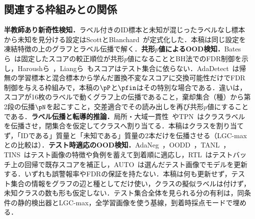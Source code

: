 \subsection{関連する枠組みとの関係}
\label{sec:related}
\textbf{半教師あり新奇性検知．}ラベル付きのID標本と未知が混じったラベルなし標本から未知を見分ける設定はScottとBlanchard~\cite{scott2009novelty,blanchard2010ssnd}が定式化した．本稿は同じ設定を凍結特徴の上のグラフとラベル伝播で解く．\textbf{共形$p$値によるOOD検知．}Batesら~\cite{bates2023conformal}は固定したスコアの較正順位が共形$p$値になることとBH法でのFDR制御を示し，Haroushら~\cite{haroush2022statistical}，Liangら~\cite{liang2024integrative}もスコアはテスト集合に依らない．AdaDetect~\cite{marandon2024adadetect}は帰無の学習標本と混合標本から学んだ置換不変なスコアに交換可能性だけでFDR制御を与える枠組みで，本稿の$\pP$と$\pfin$はその特別な場合である．違いは，スコアが16枚のラベルで動くグラフ上の伝播であること，棄却集合（種）から第2段の伝播$\pN$を起こすこと，交差適合でその読み出しを再び共形$p$値にすることである．\textbf{ラベル伝播と転導的推論．}局所・大域一貫性~\cite{zhou2004lgc}やTPN~\cite{liu2019tpn}はクラスラベルを伝播させ，閉集合を仮定してクラスへ割り当てる．本稿はクラスを割り当てず，「IDである」質量と「未知である」質量の2本だけを伝播させる（LGC-maxとの比較は）．\textbf{テスト時適応のOOD検知．}AdaNeg~\cite{zhang2024adaneg}，OODD~\cite{yang2025oodd}，TANL~\cite{zhang2026tanl}，TINS~\cite{yang2026tins}はテスト画像の特徴や負例を蓄えて到着順に適応し，RTL~\cite{fan2024rtl}はテストバッチ上の回帰で既存スコアを補正し，AUTO~\cite{yang2023auto}は選んだテスト画像でモデルを更新する．いずれも誤警報率やFDRの保証を持たない．本稿は何も更新せず，テスト集合の情報をグラフの辺と種としてだけ使い，クラスの擬似ラベルは付けず，未知クラスの数も形も仮定しない．テスト集合全体を見られる分の有利は，同条件の静的検出器とLGC-max，全学習画像を使う基線，到着時採点モードで埋める．
